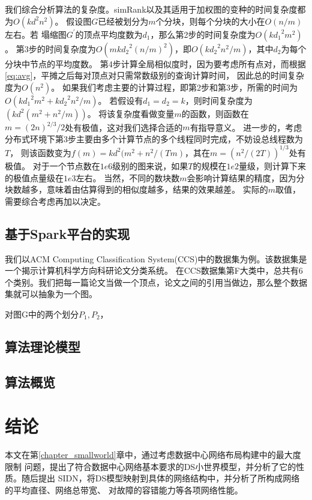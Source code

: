 \documentclass[master]{njuthesis}
\begin{document}
我们综合分析算法的复杂度。simRank以及其适用于加权图的变种的时间复杂度都为$O(kd^2n^2)$。
假设图$G$已经被划分为$m$个分块，则每个分块的大小在$O(n/m)$左右。若
塌缩图$G^\prime$的顶点平均度数为$d_1$，那么第2步的时间复杂度为$O(k{d_1}^2m^2)$。
第3步的时间复杂度为$O(mk{d_2}^2(n/m)^2)$，即$O(k{d_2}^2n^2/m)$，其中$d_2$为每个分块中节点的平均度数。
第4步计算全局相似度时，因为要考虑所有点对，而根据\ref{eq:avg}，平摊之后每对顶点对只需常数级别的查询计算时间，
因此总的时间复杂度为$O(n^2)$。
如果我们考虑主要的计算过程，即第2步和第3步，所需的时间为$O(k{d_1}^2m^2+k{d_2}^2n^2/m)$。
若假设有$d_1=d_2=k$，则时间复杂度为$(kd^2(m^2+n^2/m))$。 
将该复杂度看做变量$m$的函数，则函数在$m=(2n)^{2/3}/2$处有极值，这对我们选择合适的$m$有指导意义。
进一步的，考虑分布式环境下第3步主要由多个计算节点的多个线程同时完成，不妨设总线程数为$T$，
则该函数变为$f(m)=kd^2(m^2+n^2/(Tm)$，其在$m=(n^2/(2T))^{1/3}$处有极值。
对于一个节点数在$1e6$级别的图来说，如果$T$的规模在$1e2$量级，则计算下来的极值点量级在$1e3$左右。
当然，不同的数块数$m$会影响计算结果的精度，因为分块数越多，意味着由估算得到的相似度越多，结果的效果越差。
实际的$m$取值，需要综合考虑再加以决定。

\section{基于Spark平台的实现}

我们以ACM Computing Classification System(CCS)中的数据集为例。该数据集是一个揭示计算机科学方向科研论文分类系统。
在CCS数据集第F大类中，总共有6个类别。我们把每一篇论文当做一个顶点，论文之间的引用当做边，那么整个数据集就可以抽象为一个图。
\begin{definition}
 对图G中的两个划分$P_1, P_2$，
\end{definition}
\section{算法理论模型}
\section{算法概览}



\chapter{结论}\label{chapter_concludes}

本文在第\ref{chapter_smallworld}章中，通过考虑数据中心网络布局构建中的最大度限制
问题，提出了符合数据中心网络基本要求的DS小世界模型，并分析了它的性质。随后提出
SIDN，将DS模型映射到具体的网络结构中，并分析了所构成网络的平均直径、网络总带宽、
对故障的容错能力等各项网络性能。
\end{document}
